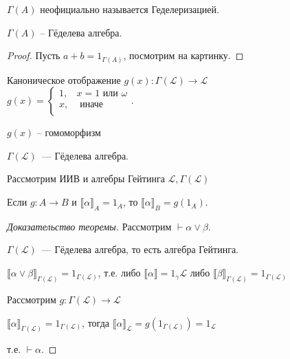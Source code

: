 \begin{remark}
    $\Gamma (A)$ неофициально называется Геделеризацией.
\end{remark}

\begin{theorem}
  $\Gamma(A)$ -- Гёделева алгебра.
\end{theorem}
\begin{proof}
    Пусть $a+b = 1_{\Gamma(A)}$, посмотрим на картинку.
\end{proof}

\begin{definition}
    Каноническое отображение $g(x): \Gamma(\mathcal L) \to \mathcal L$\\
    $g(x) = \begin{cases}
        1,& x = 1 \text{ или } \omega\\
        x,& \text{ иначе}\\
    \end{cases} $.
\end{definition}
\begin{statement}
        $g(x)$ -- гомоморфизм
\end{statement}

\begin{statement}
    $\Gamma(\mathcal L)$~--- Гёделева алгебра.
\end{statement}

\begin{theorem}
    Рассмотрим ИИВ и алгебры Гейтинга $\mathcal L, \Gamma (\mathcal{L})$
\end{theorem}

\begin{statement}
    Если $g: A \to B$ и $\llbracket\alpha\rrbracket_A = 1_A$, то
    $\llbracket \alpha \rrbracket_B = g(1_A)$.
\end{statement}


\begin{proof}[Доказательство теоремы]

    Рассмотрим $\vdash \alpha \vee \beta$.

    $\Gamma (\mathcal L)$~--- Гёделева алгебра, то есть алгебра Гейтинга.

    $\llbracket \alpha \lor \beta \rrbracket_{\Gamma(\mathcal L)} = 1_{\Gamma(\mathcal L)}$,
    т.е. либо $\llbracket \alpha \rrbracket =1_\gamma{\mathcal L}$ либо $\llbracket \beta \rrbracket _{\Gamma(\mathcal L)} = 1_{\Gamma(\mathcal L)}$

    Рассмотрим $g : \Gamma(\mathcal{L}) \to \mathcal{L}$

    $\llbracket \alpha \rrbracket _{\Gamma(\mathcal L )} = 1_{\Gamma(\mathcal L)}$, тогда $\llbracket \alpha \rrbracket _{\mathcal L} = g(1_{\Gamma(\mathcal L)}) = 1_{\mathcal L}$

    т.е. $\vdash \alpha$.
\end{proof}

